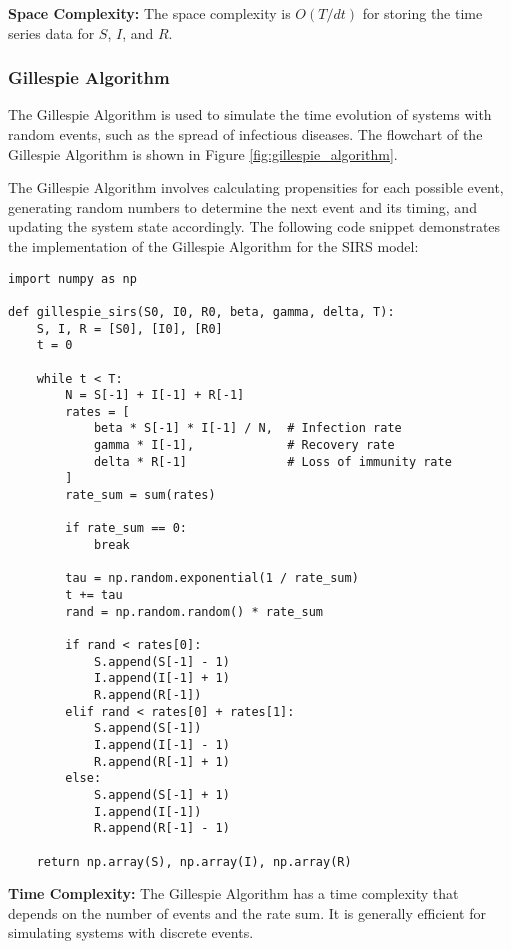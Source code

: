 \textbf{Space Complexity:} The space complexity is \(O(T / dt)\) for storing the time series data for \(S\), \(I\), and \(R\).

\subsubsection{Gillespie Algorithm}
The Gillespie Algorithm is used to simulate the time evolution of systems with random events, such as the spread of infectious diseases. The flowchart of the Gillespie Algorithm is shown in Figure \ref{fig:gillespie_algorithm}.

The Gillespie Algorithm involves calculating propensities for each possible event, generating random numbers to determine the next event and its timing, and updating the system state accordingly. The following code snippet demonstrates the implementation of the Gillespie Algorithm for the SIRS model:

\begin{lstlisting}[caption=Gillespie Algorithm for SIRS Model, label=lst:gillespie-algorithm]
import numpy as np

def gillespie_sirs(S0, I0, R0, beta, gamma, delta, T):
    S, I, R = [S0], [I0], [R0]
    t = 0

    while t < T:
        N = S[-1] + I[-1] + R[-1]
        rates = [
            beta * S[-1] * I[-1] / N,  # Infection rate
            gamma * I[-1],             # Recovery rate
            delta * R[-1]              # Loss of immunity rate
        ]
        rate_sum = sum(rates)

        if rate_sum == 0:
            break

        tau = np.random.exponential(1 / rate_sum)
        t += tau
        rand = np.random.random() * rate_sum

        if rand < rates[0]:
            S.append(S[-1] - 1)
            I.append(I[-1] + 1)
            R.append(R[-1])
        elif rand < rates[0] + rates[1]:
            S.append(S[-1])
            I.append(I[-1] - 1)
            R.append(R[-1] + 1)
        else:
            S.append(S[-1] + 1)
            I.append(I[-1])
            R.append(R[-1] - 1)

    return np.array(S), np.array(I), np.array(R)
\end{lstlisting}

\textbf{Time Complexity:} The Gillespie Algorithm has a time complexity that depends on the number of events and the rate sum. It is generally efficient for simulating systems with discrete events.

